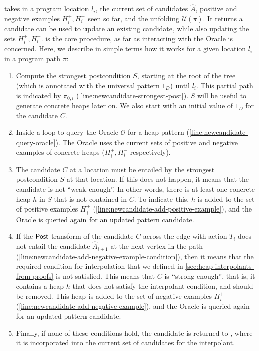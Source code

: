 \newcandidate takes in a program location $l_i$, the current set of candidates $\hat{A}$,
positive and negative examples $H_i^{+}, H_i^{-}$ seen so far, and the unfolding
$\mathcal{U}(\pi)$. It returns a candidate can be used to update an existing candidate,
while also updating the sets $H_i^{+}, H_i^{-}$. \newcandidate is the core procedure, as
far as interacting with the Oracle is concerned. Here, we describe in simple terms how it
works for a given location $l_i$ in a program path $\pi$:

\begin{enumerate}
  \item Compute the strongest postcondition $S$, starting at the root of the tree (which is annotated with the universal pattern $1_D$) until $l_i$. This partial path is indicated by $\pi_{0,i}$ (\autoref{line:newcandidate-strongest-post}). $S$ will be useful to generate concrete heaps later on. We also start with an initial value of $1_D$ for the candidate $C$.
  \item Inside a loop to query the Oracle $\mathcal{O}$ for a heap pattern (\autoref{line:newcandidate-query-oracle}). The Oracle uses the current sets of positive and negative examples of concrete heaps ($H_i^{+}, H_i^{-}$ respectively).
  \item The candidate $C$ at a location must be entailed by the strongest postcondition $S$ at that location. If this does not happen, it means that the candidate is not ``weak enough''. In other words, there is at least one concrete heap $h$ in $S$ that is not contained in $C$. To indicate this, $h$ is added to the set of positive examples $H_i^{+}$ (\autoref{line:newcandidate-add-positive-example}), and the Oracle is queried again for an updated pattern candidate.
  \item If the $\mathsf{Post}$ transform of the candidate $C$ across the edge with action $T_i$ does not entail the candidate $\hat{A}_{i+1}$ at the next vertex in the path (\autoref{line:newcandidate-add-negative-example-condition}), then it means that the required condition for interpolation that we defined in \autoref{sec:heap-interpolants-from-proofs} is not satisfied. This means that $C$ is ``strong enough'', that is, it contains a heap $h$ that does not satisfy the interpolant condition, and should be removed. This heap is added to the set of negative examples $H_i^{+}$ (\autoref{line:newcandidate-add-negative-example}), and the Oracle is queried again for an updated pattern candidate.
  \item Finally, if none of these conditions hold, the candidate is returned to \seplearner, where it is incorporated into the current set of candidates for the interpolant.
\end{enumerate}

